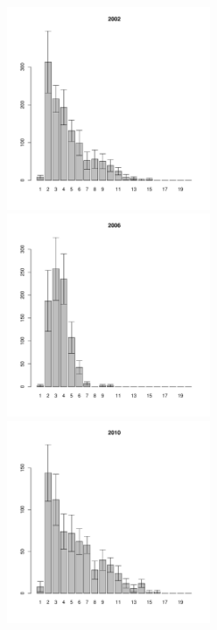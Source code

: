 \begin{figure}[h]


\begin{multicols}{3}
\hfill
\includegraphics[width=60mm]{../White_Sea/Ryashkov_YuG/YuG_2002_.pdf}
\hfill
\includegraphics[width=60mm]{../White_Sea/Ryashkov_YuG/YuG_2006_.pdf}
\hfill
\includegraphics[width=60mm]{../White_Sea/Ryashkov_YuG/YuG_2010_.pdf}
\end{multicols}



\end{figure}
